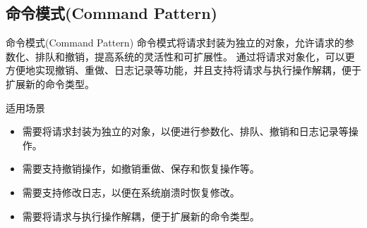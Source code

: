 \documentclass[UTF8,aspectratio=169]{beamer}
\begin{document}
\subsection{命令模式(Command Pattern)}

\begin{frame}{命令模式(Command Pattern)}
    命令模式将请求封装为独立的对象，允许请求的参数化、排队和撤销，提高系统的灵活性和可扩展性。
    通过将请求对象化，可以更方便地实现撤销、重做、日志记录等功能，并且支持将请求与执行操作解耦，便于扩展新的命令类型。

    \begin{ytublock}{适用场景}
        \begin{itemize}
            \item 需要将请求封装为独立的对象，以便进行参数化、排队、撤销和日志记录等操作。
            \item 需要支持撤销操作，如撤销重做、保存和恢复操作等。
            \item 需要支持修改日志，以便在系统崩溃时恢复修改。
            \item 需要将请求与执行操作解耦，便于扩展新的命令类型。
        \end{itemize}
    \end{ytublock}
\end{frame}
\end{document}
